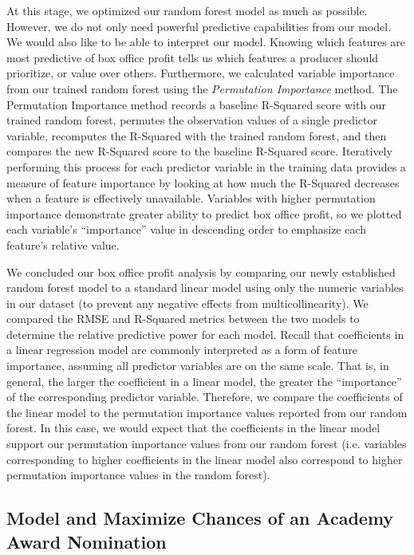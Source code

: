 \documentclass[10pt]{article}
\begin{document}
At this stage, we optimized our random forest model as much as possible. However, we do not only need powerful predictive capabilities from our model. We would also like to be able to interpret our model. Knowing which features are most predictive of box office profit tells us which features a producer should prioritize, or value over others. Furthermore, we calculated variable importance from our trained random forest using the \textit{Permutation Importance} method. The Permutation Importance method records a baseline R-Squared score with our trained random forest, permutes the observation values of a single predictor variable, recomputes the R-Squared with the trained random forest, and then compares the new R-Squared score to the baseline R-Squared score. Iteratively performing this process for each predictor variable in the training data provides a measure of feature importance by looking at how much the R-Squared decreases when a feature is effectively unavailable. Variables with higher permutation importance demonstrate greater ability to predict box office profit, so we plotted each variable’s “importance” value in descending order to emphasize each feature’s relative value. 

We concluded our box office profit analysis by comparing our newly established random forest model to a standard linear model using only the numeric variables in our dataset (to prevent any negative effects from multicollinearity). We compared the RMSE and R-Squared metrics between the two models to determine the relative predictive power for each model. Recall that coefficients in a linear regression model are commonly interpreted as a form of feature importance, assuming all predictor variables are on the same scale. That is, in general, the larger the coefficient in a linear model, the greater the “importance” of the corresponding predictor variable. Therefore, we compare the coefficients of the linear model to the permutation importance values reported from our random forest. In this case, we would expect that the coefficients in the linear model support our permutation importance values from our random forest (i.e. variables corresponding to higher coefficients in the linear model also correspond to higher permutation importance values in the random forest).  

\subsection{Model and Maximize Chances of an Academy Award Nomination}
\end{document}
